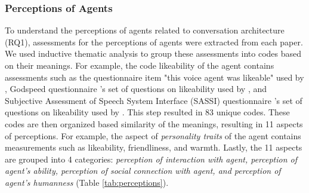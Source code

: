 \documentclass[sigconf,screen,review, anonymous]{acmart}
\newcommand{\cmt}[1]{}%
\begin{document}
\subsubsection*{Perceptions of Agents} To understand the perceptions of agents related to conversation architecture (RQ1), assessments for the perceptions of agents were extracted from each paper. We used inductive thematic analysis to group these assessments into codes based on their meanings. For example, the code likeability of the agent contains assessments such as the questionnaire item "this voice agent was likeable" used by \cite{cuadra2021my}\cmt{[67]}, Godspeed questionnaire \cite{bartneck2009measurement}\cmt{godspeed}'s set of questions on likeability used by \cite{linnemann2018can}\cmt{[15]}, and Subjective Assessment of Speech System Interface (SASSI) questionnaire \cite{hone2000towards}\cmt{sassi}'s set of questions on likeability used by \cite{chan2021kinvoices}\cmt{[74]}\cite{choi2020nobody}\cmt{[54]}. This step resulted in 83 unique codes. These codes are then organized based similarity of the meanings, resulting in 11 aspects of perceptions. For example, the aspect of \textit{personality traits} of the agent contains measurements such as likeability, friendliness, and warmth. Lastly, the 11 aspects are grouped into 4 categories: \textit{perception of interaction with agent, perception of agent's ability, perception of social connection with agent, and perception of agent's humanness} (Table \ref{tab:perceptions}).
\end{document}

